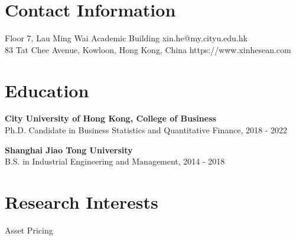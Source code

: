 \documentclass[margin]{res}
\begin{document}
	\begin{resume}
		
		
		
		
		\section{\sc Contact Information}
		Floor 7, Lau Ming Wai Academic Building	   \hfill xin.he@my.cityu.edu.hk\\        
		83 Tat Chee Avenue, Kowloon, Hong Kong, China 	\hfill   https://www.xinhesean.com \\
		
		\vspace{5mm}
		
		\section{\sc Education}
		\textbf{City University of Hong Kong, College of Business}\\
		{Ph.D. Candidate in Business Statistics and Quantitative Finance, 2018 - 2022}
		
		\textbf{Shanghai Jiao Tong University}\\
		{B.S. in Industrial Engineering and Management, 2014 - 2018}
		
		\vspace{5mm}
		
		\section{\sc Research Interests}
		{Asset Pricing}
		

\end{resume}
\end{document}
